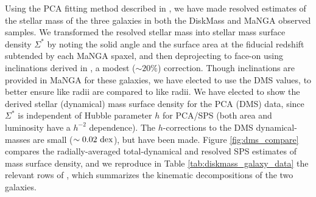 %
Using the PCA fitting method described in , we have made resolved estimates of the stellar mass of the three galaxies in both the DiskMass and MaNGA observed samples. We transformed the resolved stellar mass into stellar mass surface density $\Sigma^*$ by noting the solid angle and the surface area at the fiducial redshift subtended by each MaNGA spaxel, and then deprojecting to face-on using inclinations derived in \citet{diskmass_vi}, a modest ($\sim 20\%$) correction. Though inclinations are provided in MaNGA for these galaxies, we have elected to use the DMS values, to better ensure like radii are compared to like radii. We have elected to show the derived stellar (dynamical) mass surface density for the PCA (DMS) data, since $\Sigma^*$ is independent of Hubble parameter $h$ for PCA/SPS (both area and luminosity have a $h^{-2}$ dependence). The $h$-corrections to the DMS dynamical-masses are small ($\sim 0.02~{\rm dex}$), but have been made. Figure \ref{fig:dms_compare} compares the radially-averaged total-dynamical and resolved SPS estimates of mass surface density, and we reproduce in Table \ref{tab:diskmass_galaxy_data} the relevant rows of \citet[][Table 4]{diskmass_vii}, which summarizes the kinematic decompositions of the two galaxies.

